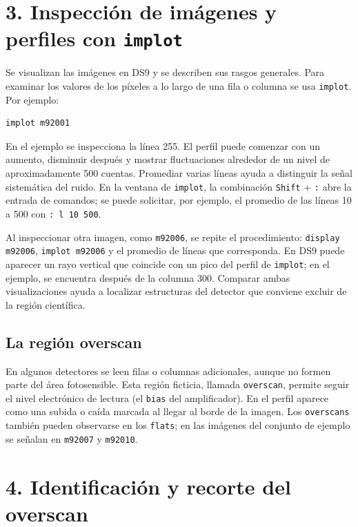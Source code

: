\documentclass[11pt]{article}
\begin{document}
\newpage
\section*{3. Inspección de imágenes y perfiles con \texttt{implot}}

Se visualizan las imágenes en DS9 y se describen sus rasgos generales. Para
examinar los valores de los píxeles a lo largo de una fila o columna se usa
\texttt{implot}. Por ejemplo:

\begin{verbatim}
implot m92001
\end{verbatim}

En el ejemplo se inspecciona la línea 255. El perfil puede comenzar con un
aumento, disminuir después y mostrar fluctuaciones alrededor de un nivel de
aproximadamente 500 cuentas. Promediar varias líneas ayuda a distinguir la
señal sistemática del ruido. En la ventana de \texttt{implot}, la combinación
\texttt{Shift} + \texttt{:} abre la entrada de comandos; se puede solicitar,
por ejemplo, el promedio de las líneas 10 a 500 con \texttt{: l 10 500}.

\begin{center}
  
\end{center}

Al inspeccionar otra imagen, como \texttt{m92006}, se repite el procedimiento:
\texttt{display m92006}, \texttt{implot m92006} y el promedio de líneas que
corresponda. En DS9 puede aparecer un rayo vertical que coincide con un pico
del perfil de \texttt{implot}; en el ejemplo, se encuentra después de la
columna 300. Comparar ambas visualizaciones ayuda a localizar estructuras del
detector que conviene excluir de la región científica.

\subsection*{La región overscan}
En algunos detectores se leen filas o columnas adicionales, aunque no formen
parte del área fotosensible. Esta región ficticia, llamada \texttt{overscan},
permite seguir el nivel electrónico de lectura (el \texttt{bias} del
amplificador). En el perfil aparece como una subida o caída marcada al llegar
al borde de la imagen. Los \texttt{overscans} también pueden observarse en los
\texttt{flats}; en las imágenes del conjunto de ejemplo se señalan en
\texttt{m92007} y \texttt{m92010}.

\newpage
\section*{4. Identificación y recorte del overscan}
\end{document}
